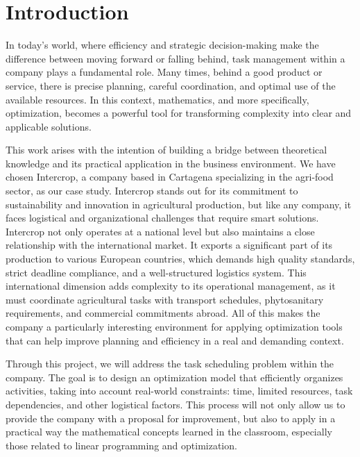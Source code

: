 \chapter*{Introduction}

In today's world, where efficiency and strategic decision-making make the difference 
between moving forward or falling behind, task management within a company plays a fundamental role.
Many times, behind a good product or service, there is precise planning, careful coordination, and optimal use of the available resources.
In this context, mathematics, and more specifically, optimization, becomes a powerful tool for transforming complexity into clear and applicable solutions.

This work arises with the intention of building a bridge between theoretical knowledge and its practical application in the business environment.
We have chosen Intercrop, a company based in Cartagena specializing in the agri-food sector, as our case study.
Intercrop stands out for its commitment to sustainability and innovation in agricultural production, but like any company, it faces logistical and organizational challenges that require smart solutions.
Intercrop not only operates at a national level but also maintains a close relationship with the international market.
It exports a significant part of its production to various European countries, which demands high quality standards, strict deadline compliance, and a well-structured logistics system.
This international dimension adds complexity to its operational management, as it must coordinate agricultural tasks with transport schedules, phytosanitary requirements, and commercial commitments abroad.
All of this makes the company a particularly interesting environment for applying optimization tools that can help improve planning and efficiency in a real and demanding context.

Through this project, we will address the task scheduling problem within the company. The goal is to design an optimization model that efficiently organizes activities, taking into account real-world constraints: time, limited resources, task dependencies, and other logistical factors.
This process will not only allow us to provide the company with a proposal for improvement, but also to apply in a practical way the mathematical concepts learned in the classroom, especially those related to linear programming and optimization.


